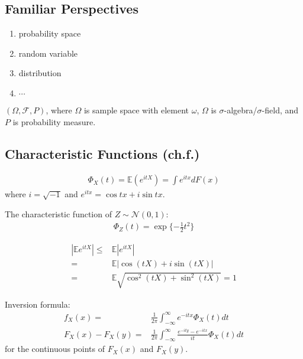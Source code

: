 \subsection{Familiar Perspectives}

\begin{enumerate}
    \item probability space
    \item random variable
    \item distribution
    \item $\cdots$
\end{enumerate}


\begin{definition}
    $(\Omega,\mathcal{F},P)$, 
    where $\Omega$ is sample space with element $\omega$,
    $\Omega$ is $\sigma$-algebra/$\sigma$-field, and 
    $P$ is probability measure.
\end{definition}

\subsection{Characteristic Functions (ch.f.)}

\begin{definition}[ch.f.]
    \begin{gather}
        \Phi_X(t)=\mathbb{E}(e^{itX})=\int{e^{itx}}dF(x)
    \end{gather}
    where $i=\sqrt{-1}$ and $e^{itx}=\cos{tx}+i\sin{tx}$.
\end{definition}

\begin{example}
    The characteristic function of $Z\sim{\mathcal{N}(0,1)}$:
    \begin{gather}
        \Phi_Z(t)=\exp{\{-\frac{1}{2}t^2\}}
    \end{gather}
\end{example}

\begin{align}
    |\mathbb{E}e^{itX}| 
    \leq& \mathbb{E}|e^{itX}| \\
    =& \mathbb{E}|\cos{(tX)}+i\sin{(tX)}| \\
    =& \mathbb{E}\sqrt{\cos^2(tX)+\sin^2(tX)}=1
\end{align}

Inversion formula:
\begin{align}
    f_X(x)=&\frac{1}{2\pi}\int_{-\infty}^\infty{e^{-itx}\Phi_X(t)}dt \\
    F_X(x) - F_X(y)=&\frac{1}{2\pi}\int_{-\infty}^\infty\frac{e^{-ity}-e^{-itx}}{it}\Phi_X(t)dt
\end{align}
for the continuous points of $F_X(x)$ and $F_X(y)$.

